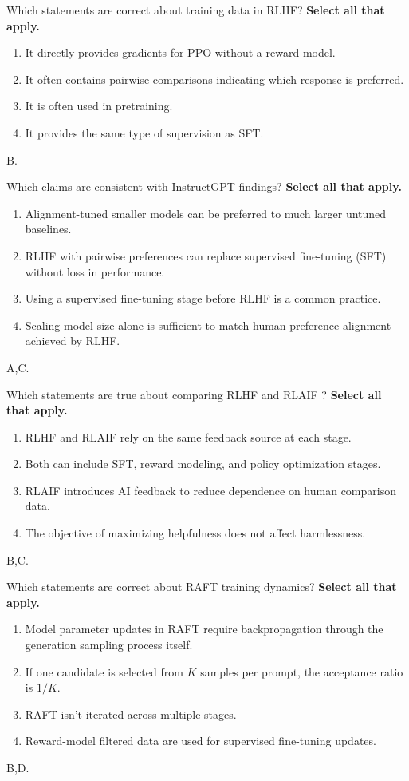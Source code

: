 \question[4]
  Which statements are correct about training data in RLHF? \textbf{Select all that apply.}
\begin{enumerate}
\item It directly provides gradients for PPO without a reward model.
\item It often contains pairwise comparisons indicating which response is preferred.
\item It is often used in pretraining.
\item It provides the same type of supervision as SFT.
\end{enumerate}
\begin{soln}
B.
\end{soln}

\question[4]
  Which claims are consistent with InstructGPT findings? \textbf{Select all that apply.}
\begin{enumerate}
\item Alignment-tuned smaller models can be preferred to much larger untuned baselines.
\item RLHF with pairwise preferences can replace supervised fine-tuning (SFT) without loss in performance.
\item Using a supervised fine-tuning stage before RLHF is a common practice.
\item Scaling model size alone is sufficient to match human preference alignment achieved by RLHF.
\end{enumerate}
\begin{soln}
A,C.
\end{soln}

\question[4]
Which statements are true about comparing RLHF and RLAIF ? \textbf{Select all that apply.}
\begin{enumerate}
\item RLHF and RLAIF rely on  the same feedback source at each stage. 
\item Both can include SFT, reward modeling, and policy optimization stages.
\item RLAIF introduces AI feedback to reduce dependence on human comparison data.
\item The objective of maximizing helpfulness does not affect harmlessness.
\end{enumerate}
\begin{soln}
B,C.
\end{soln}

\question[4]
Which statements are correct about RAFT training dynamics? \textbf{Select all that apply.}
\begin{enumerate}
\item Model parameter updates in RAFT require backpropagation through the generation sampling process itself.
\item If one candidate is selected from $K$ samples per prompt, the acceptance ratio is $1/K$.
\item RAFT isn't iterated across multiple stages.
\item Reward-model filtered data are used for supervised fine-tuning updates.
\end{enumerate}
\begin{soln}
B,D.
\end{soln}

